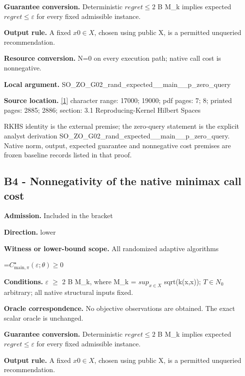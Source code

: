 \documentclass[10pt,a4paper]{article}
\newcommand{\AtlasMath}[1]{\par\begingroup\centering\setbox0=\hbox{$\displaystyle #1$}\ifdim\wd0>1.4\linewidth\typeout{ATLAS WIDE FORMULA: \the\wd0}\fi\ifdim\wd0>\linewidth\resizebox{\linewidth}{!}{\box0}\else\box0\fi\par\endgroup}
\begin{document}
\textbf{Guarantee conversion.} Deterministic $regret\le 2$ B M\_\allowbreak{}k implies expected $regret\le \varepsilon$ for every fixed admissible instance.

\textbf{Output rule.} A fixed $x0\in X$, chosen using public X, is a permitted unqueried recommendation.

\textbf{Resource conversion.} N=0 on every execution path; native call cost is nonnegative.

\textbf{Local argument.} SO\_\allowbreak{}ZO\_\allowbreak{}G02\_\allowbreak{}rand\_\allowbreak{}expected\_\allowbreak{}\_\allowbreak{}main\_\allowbreak{}\_\allowbreak{}p\_\allowbreak{}zero\_\allowbreak{}query

\textbf{Source location.} \href{https://www.jmlr.org/papers/volume12/bull11a/bull11a.pdf}{[1]} character range: 17000; 19000; pdf pages: 7; 8; printed pages: 2885; 2886; section: 3.1 Reproducing-Kernel Hilbert Spaces

RKHS identity is the external premise; the zero-query statement is the explicit analyst derivation SO\_\allowbreak{}ZO\_\allowbreak{}G02\_\allowbreak{}rand\_\allowbreak{}expected\_\allowbreak{}\_\allowbreak{}main\_\allowbreak{}\_\allowbreak{}p\_\allowbreak{}zero\_\allowbreak{}query. Native norm, output, expected guarantee and nonnegative cost premises are frozen baseline records listed in that proof.

\subsection{B4 - Nonnegativity of the native minimax call cost}
\textbf{Admission.} Included in the bracket

\textbf{Direction.} lower

\textbf{Witness or lower-bound scope.} All randomized adaptive algorithms

\AtlasMath{C^\star_{\mathrm{main},\pi}(\varepsilon;\theta)\ge 0}
\textbf{Conditions.} $\varepsilon$ $\ge$ 2 B M\_\allowbreak{}k, where M\_\allowbreak{}k = $sup_{x\in X}$ sqrt(k(x,x)); $T\in N_0$ arbitrary; all native structural inputs fixed.

\textbf{Oracle correspondence.} No objective observations are obtained. The exact scalar oracle is unchanged.

\textbf{Guarantee conversion.} Deterministic $regret\le 2$ B M\_\allowbreak{}k implies expected $regret\le \varepsilon$ for every fixed admissible instance.

\textbf{Output rule.} A fixed $x0\in X$, chosen using public X, is a permitted unqueried recommendation.
\end{document}
